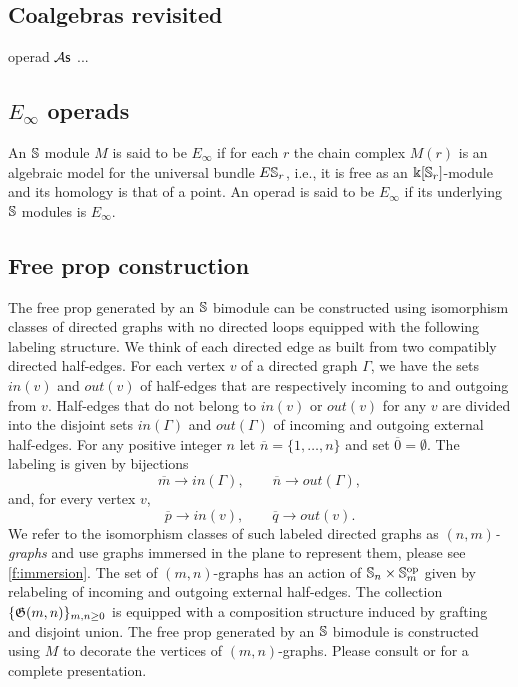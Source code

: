 \subsection{Coalgebras revisited}

operad $\As$ ...

\subsection{$E_\infty$ operads}

An $\S$ module $M$ is said to be $E_\infty$ if for each $r$ the chain complex $M(r)$ is an algebraic model for the universal bundle $E\S_r$, i.e., it is free as an $\k[\S_r]$-module and its homology is that of a point.
An operad is said to be $E_\infty$ if its underlying $\S$ modules is $E_\infty$.

\subsection{Free prop construction}

The free prop generated by an $\S$ bimodule can be constructed using isomorphism classes of directed graphs with no directed loops equipped with the following labeling structure.
We think of each directed edge as built from two compatibly directed half-edges. For each vertex $v$ of a directed graph $\Gamma$, we have the sets $in(v)$ and $out(v)$ of half-edges that are respectively incoming to and outgoing from $v$. Half-edges that do not belong to $in(v)$ or $out(v)$ for any $v$ are divided into the disjoint sets $in(\Gamma)$ and $out(\Gamma)$ of incoming and outgoing external half-edges.
For any positive integer $n$ let $\overline{n} = \{1,\dots,n\}$ and set $\overline{0} = \emptyset$.
The labeling is given by bijections  
\begin{equation*}
\overline{m} \to in(\Gamma), \qquad
\overline{n} \to out(\Gamma),
\end{equation*}
and, for every vertex $v$,
\begin{equation*}
\overline{p} \to in(v), \qquad
\overline{q} \to out(v).
\end{equation*}
We refer to the isomorphism classes of such labeled directed graphs as $(n,m)$\textit{-graphs} and use graphs immersed in the plane to represent them, please see \cref{f:immersion}.
The set of $(m,n)$-graphs has an action of $\S_n \times \S_m^{\op}$ given by relabeling of incoming and outgoing external half-edges.
The collection $\{\G(m,n)\}_{m,n \geq 0}$ is equipped with a composition structure induced by grafting and disjoint union.
The free prop generated by an $\S$ bimodule is constructed using $M$ to decorate the vertices of $(m,n)$-graphs.
Please consult \cite{markl2008props} or \cite{fresse2010props} for a complete presentation.

